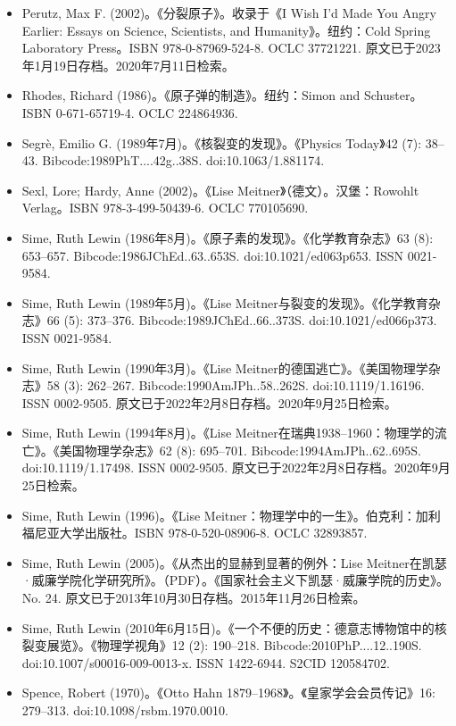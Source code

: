 \begin{itemize}
\item Perutz, Max F. (2002)。《分裂原子》。收录于《I Wish I'd Made You Angry Earlier: Essays on Science, Scientists, and Humanity》。纽约：Cold Spring Laboratory Press。ISBN 978-0-87969-524-8. OCLC 37721221. 原文已于2023年1月19日存档。2020年7月11日检索。
\item Rhodes, Richard (1986)。《原子弹的制造》。纽约：Simon and Schuster。ISBN 0-671-65719-4. OCLC 224864936.
\item Segrè, Emilio G. (1989年7月)。《核裂变的发现》。《Physics Today》42 (7): 38–43. Bibcode:1989PhT....42g..38S. doi:10.1063/1.881174.
\item Sexl, Lore; Hardy, Anne (2002)。《Lise Meitner》（德文）。汉堡：Rowohlt Verlag。ISBN 978-3-499-50439-6. OCLC 770105690.
\item Sime, Ruth Lewin (1986年8月)。《原子素的发现》。《化学教育杂志》63 (8): 653–657. Bibcode:1986JChEd..63..653S. doi:10.1021/ed063p653. ISSN 0021-9584.
\item Sime, Ruth Lewin (1989年5月)。《Lise Meitner与裂变的发现》。《化学教育杂志》66 (5): 373–376. Bibcode:1989JChEd..66..373S. doi:10.1021/ed066p373. ISSN 0021-9584.
\item Sime, Ruth Lewin (1990年3月)。《Lise Meitner的德国逃亡》。《美国物理学杂志》58 (3): 262–267. Bibcode:1990AmJPh..58..262S. doi:10.1119/1.16196. ISSN 0002-9505. 原文已于2022年2月8日存档。2020年9月25日检索。
\item Sime, Ruth Lewin (1994年8月)。《Lise Meitner在瑞典1938–1960：物理学的流亡》。《美国物理学杂志》62 (8): 695–701. Bibcode:1994AmJPh..62..695S. doi:10.1119/1.17498. ISSN 0002-9505. 原文已于2022年2月8日存档。2020年9月25日检索。
\item Sime, Ruth Lewin (1996)。《Lise Meitner：物理学中的一生》。伯克利：加利福尼亚大学出版社。ISBN 978-0-520-08906-8. OCLC 32893857.
\item Sime, Ruth Lewin (2005)。《从杰出的显赫到显著的例外：Lise Meitner在凯瑟·威廉学院化学研究所》。（PDF）。《国家社会主义下凯瑟·威廉学院的历史》。No. 24. 原文已于2013年10月30日存档。2015年11月26日检索。
\item Sime, Ruth Lewin (2010年6月15日)。《一个不便的历史：德意志博物馆中的核裂变展览》。《物理学视角》12 (2): 190–218. Bibcode:2010PhP....12..190S. doi:10.1007/s00016-009-0013-x. ISSN 1422-6944. S2CID 120584702.
\item Spence, Robert (1970)。《Otto Hahn 1879–1968》。《皇家学会会员传记》16: 279–313. doi:10.1098/rsbm.1970.0010.


\end{itemize}
